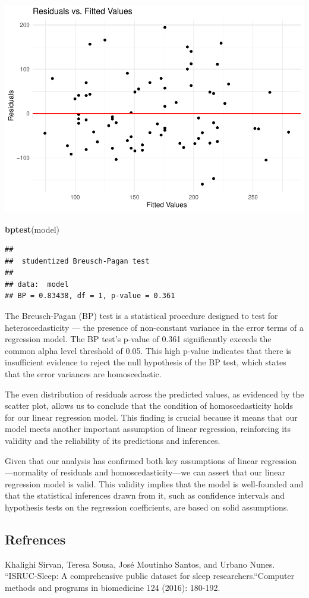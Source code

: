 \documentclass[
]{article}
\newenvironment{Shaded}{\begin{snugshade}}{\end{snugshade}}
\newcommand{\FunctionTok}[1]{\textcolor[rgb]{0.13,0.29,0.53}{\textbf{#1}}}
\newcommand{\NormalTok}[1]{#1}
\begin{document}
\includegraphics{602_project_files/figure-latex/unnamed-chunk-24-1.pdf}

\begin{Shaded}
\begin{Highlighting}[]
\FunctionTok{bptest}\NormalTok{(model)}
\end{Highlighting}
\end{Shaded}

\begin{verbatim}
## 
##  studentized Breusch-Pagan test
## 
## data:  model
## BP = 0.83438, df = 1, p-value = 0.361
\end{verbatim}

The Breusch-Pagan (BP) test is a statistical procedure designed to test
for heteroscedasticity --- the presence of non-constant variance in the
error terms of a regression model. The BP test's p-value of 0.361
significantly exceeds the common alpha level threshold of 0.05. This
high p-value indicates that there is insufficient evidence to reject the
null hypothesis of the BP test, which states that the error variances
are homoscedastic.

The even distribution of residuals across the predicted values, as
evidenced by the scatter plot, allows us to conclude that the condition
of homoscedasticity holds for our linear regression model. This finding
is crucial because it means that our model meets another important
assumption of linear regression, reinforcing its validity and the
reliability of its predictions and inferences.

Given that our analysis has confirmed both key assumptions of linear
regression---normality of residuals and homoscedasticity---we can assert
that our linear regression model is valid. This validity implies that
the model is well-founded and that the statistical inferences drawn from
it, such as confidence intervals and hypothesis tests on the regression
coefficients, are based on solid assumptions.

\hypertarget{refrences}{%
\subsection{Refrences}\label{refrences}}

Khalighi Sirvan, Teresa Sousa, José Moutinho Santos, and Urbano Nunes.
``ISRUC-Sleep: A comprehensive public dataset for sleep
researchers.``Computer methods and programs in biomedicine 124 (2016):
180-192.
\end{document}
